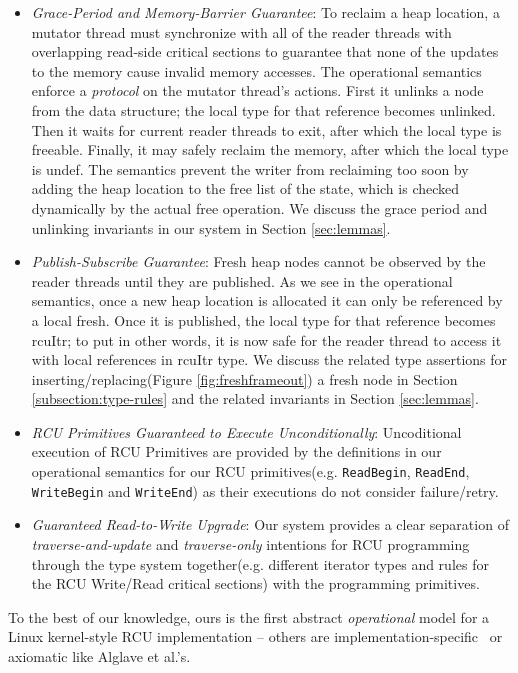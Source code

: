 \begin{itemize}
  \item \textit{Grace-Period and Memory-Barrier Guarantee}: To reclaim a heap location, a mutator thread must synchronize with all of the reader threads with overlapping read-side critical sections to guarantee that none of the updates to the memory cause invalid memory accesses.
The operational semantics enforce a \textit{protocol} on the mutator thread's actions. First it unlinks a node from the data structure; the local type for that reference becomes \textsf{unlinked}. Then it waits for current reader threads to exit, after which the local type is \textsf{freeable}. Finally, it may safely reclaim the memory, after which the local type is \textsf{undef}.
The semantics prevent the writer from reclaiming too soon by adding the heap location to the free list of the state, which is checked dynamically by the actual free operation. We discuss the grace period and unlinking invariants in our system in Section \ref{sec:lemmas}.
\item \textit{Publish-Subscribe Guarantee}: Fresh heap nodes cannot be observed by the reader threads until they are published. As we see in the operational semantics, once a new heap location is allocated it can only be referenced by a local \textsf{fresh}. Once it is published, the local type for that reference becomes \textsf{rcuItr}; to put in other words, it is now safe for the reader thread to access it with local references in \textsf{rcuItr} type. We discuss the related type assertions for inserting/replacing(Figure \ref{fig:freshframeout}) a fresh node in Section \ref{subsection:type-rules} and the related invariants in Section \ref{sec:lemmas}.
\item \textit{RCU Primitives Guaranteed to Execute Unconditionally}: Uncoditional execution of RCU Primitives are provided by the definitions in our operational semantics for our RCU primitives(e.g. \lstinline|ReadBegin|, \lstinline|ReadEnd|, \lstinline|WriteBegin| and \lstinline|WriteEnd|) as their executions do not consider failure/retry.
\item \textit{Guaranteed Read-to-Write Upgrade}: Our system provides a clear separation of \textit{traverse-and-update} and \textit{traverse-only} intentions for \textsf{RCU} programming through the type system together(e.g. different iterator types and rules for the RCU Write/Read critical sections) with the programming primitives. 
  \end{itemize}
To the best of our knowledge, ours is the first abstract \emph{operational} model for a Linux kernel-style RCU implementation -- others are implementation-specific~\cite{Mandrykin:2016:TDV:3001219.3001297} or axiomatic like Alglave et al.'s.

